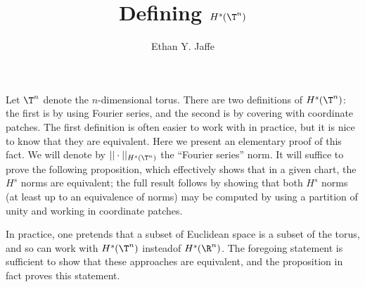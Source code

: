 \documentclass[12pt]{article}
\title{Defining $H^s(\T^n)$}
\author{Ethan Y. Jaffe}
\date{}
\begin{document}
\maketitle
Let $\T^n$ denote the $n$-dimensional torus. There are two definitions of $H^s(\T^n)$: the first is by using Fourier series, and the second is by covering with coordinate patches. The first definition is often easier to work with in practice, but it is nice to know that they are equivalent. Here we present an elementary proof of this fact. We will denote by $||\cdot||_{H^s(\T^n)}$ the ``Fourier series'' norm. It will suffice to prove the following proposition, which effectively shows that in a given chart, the $H^s$ norms are equivalent; the full result follows by showing that both $H^s$ norms (at least up to an equivalence of norms) may be computed by using a partition of unity and working in coordinate patches.

In practice, one pretends that a subset of Euclidean space is a subset of the torus, and so can work with $H^s(\T^n)$ insteadof $H^s(\R^n)$. The foregoing statement is sufficient to show that these approaches are equivalent, and the proposition in fact proves this statement.
\end{document}

